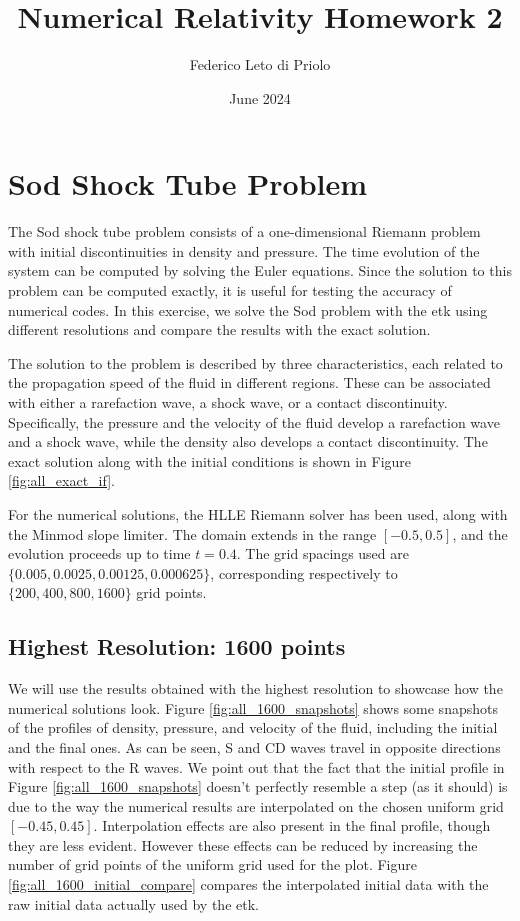 \documentclass[11pt, a4paper]{article}
\title{Numerical Relativity Homework 2}
\author{Federico Leto di Priolo}
\date{June 2024}
\begin{document}
\maketitle

\section{Sod Shock Tube Problem} \label{sec:sod_main}

The Sod shock tube problem consists of a one-dimensional Riemann problem with initial discontinuities in density and pressure. The time evolution of the system can be computed by solving the Euler equations. Since the solution to this problem can be computed exactly, it is useful
for testing the accuracy of numerical codes. In this exercise, we solve the Sod problem with the \acrfull{etk} using different resolutions and compare the results with the exact solution.

The solution to the problem is described by three characteristics, each related to the propagation speed of the fluid in different regions. These can be associated with either a rarefaction wave, a shock wave, or a contact discontinuity. Specifically, the pressure and the velocity of the fluid develop a rarefaction wave and a shock wave, while the density also develops a contact discontinuity. The exact solution along with the initial conditions is shown in Figure \ref{fig:all_exact_if}.

For the numerical solutions, the HLLE Riemann solver has been used, along with the Minmod slope limiter. The domain extends in the range
\([-0.5, 0.5]\), and the evolution proceeds up to time \(t = 0.4\). The grid spacings used are \(\{0.005, 0.0025, 0.00125, 0.000625\}\), corresponding respectively to \(\{200, 400, 800, 1600\}\) grid points.

\subsection{Highest Resolution: 1600 points} \label{sec:highres1600}

We will use the results obtained with the highest resolution to showcase how the numerical solutions look. Figure \ref{fig:all_1600_snapshots} shows some snapshots of the profiles of density, pressure, and velocity of the fluid, including the initial and the final ones. As can be seen, S and CD waves travel in opposite directions with respect to the R waves. We point out that the fact that the initial profile in Figure \ref{fig:all_1600_snapshots} doesn't perfectly resemble a step (as it should) is due to the way the numerical results are interpolated on the chosen uniform grid \([-0.45, 0.45]\). Interpolation effects are also present in the final profile, though they are less evident. However these effects can be reduced by increasing the number of grid points of the uniform grid used for the plot. Figure \ref{fig:all_1600_initial_compare} compares the interpolated initial data with the raw initial data actually used by the \acrshort{etk}.
\end{document}
